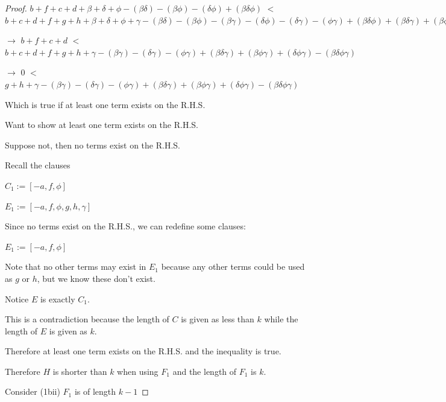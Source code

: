 \documentclass[manuscript]{acmart}
\begin{document}
\begin{proof}
        $b + f + c + d 
        + \beta + \delta + \phi
        - (\beta \delta) - (\beta \phi) - (\delta \phi)
        + (\beta \delta \phi) $
        $<$
        $b + c + d + f + g + h 
        + \beta + \delta + \phi + \gamma
        - (\beta \delta) - (\beta \phi) - (\beta \gamma) - (\delta \phi) - (\delta \gamma) - (\phi \gamma)
        + (\beta \delta \phi) + (\beta \delta \gamma) + (\beta \phi \gamma) + (\delta \phi \gamma)
        - (\beta \delta \phi \gamma)
        $

        $\rightarrow$
        $b + f + c + d$
        $<$
        $b + c + d + f + g + h 
        + \gamma
        - (\beta \gamma) - (\delta \gamma) - (\phi \gamma)
        + (\beta \delta \gamma) + (\beta \phi \gamma) + (\delta \phi \gamma)
        - (\beta \delta \phi \gamma)
        $

        $\rightarrow$
        $0$
        $<$
        $g + h 
        + \gamma
        - (\beta \gamma) - (\delta \gamma) - (\phi \gamma)
        + (\beta \delta \gamma) + (\beta \phi \gamma) + (\delta \phi \gamma)
        - (\beta \delta \phi \gamma)
        $

        Which is true if at least one term exists on the R.H.S.

        Want to show at least one term exists on the R.H.S.

        Suppose not, then no terms exist on the R.H.S.

        Recall the clauses

        $C_1 := [-a, f, \phi]$

        $E_1 := [-a, f, \phi, g, h, \gamma]$

        Since no terms exist on the R.H.S., we can redefine some clauses:

        $E_1 := [-a, f, \phi]$

        Note that no other terms may exist in $E_1$ because any other terms could be used as $g$ or $h$, but we know these don't exist.

        Notice $E$ is exactly $C_1$.

        This is a contradiction because the length of $C$ is given as less than $k$ while the length of $E$ is given as $k$.

        Therefore at least one term exists on the R.H.S. and the inequality is true.

        Therefore $H$ is shorter than $k$ when using $F_1$ and the length of $F_1$ is $k$.

        Consider (1bii) $F_1$ is of length $k-1$


\end{proof}
\end{document}
